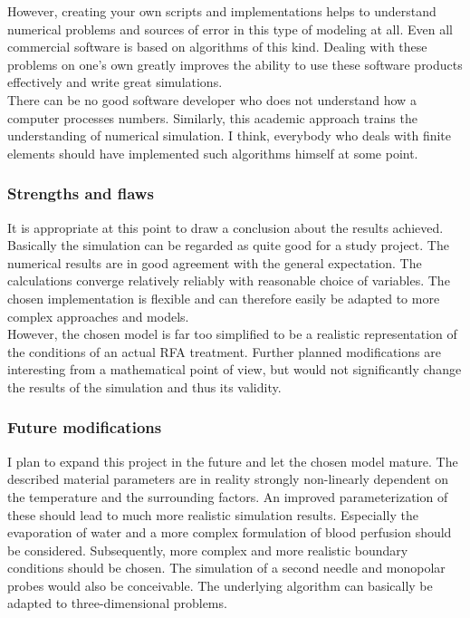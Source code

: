 \documentclass[parskip=half, titlepage=yes, 12pt, BCOR=12mm, DIV=calc]{scrartcl}
\begin{document}
However, creating your own scripts and implementations helps to understand numerical problems and sources of error in this type of modeling at all. Even all commercial software is based on algorithms of this kind. Dealing with these problems on one's own greatly improves the ability to use these software products effectively and write great simulations.\\

There can be no good software developer who does not understand how a computer processes numbers. Similarly, this academic approach trains the understanding of numerical simulation. I think, everybody who deals with finite elements should have implemented such algorithms himself at some point. \\

\subsubsection{Strengths and flaws}
It is appropriate at this point to draw a conclusion about the results achieved. \\
Basically the simulation can be regarded as quite good for a study project. 
The numerical results are in good agreement with the general expectation. The calculations converge relatively reliably with reasonable choice of variables.
The chosen implementation is flexible and can therefore easily be adapted to more complex approaches and models. \\
However, the chosen model is far too simplified to be a realistic representation of the conditions of an actual RFA treatment. Further planned modifications are interesting from a mathematical point of view, but would not significantly change the results of the simulation and thus its validity.


\subsubsection{Future modifications}
I plan to expand this project in the future and let the chosen model mature. The described material parameters are in reality strongly non-linearly dependent on the temperature and the surrounding factors. An improved parameterization of these should lead to much more realistic simulation results. Especially the evaporation of water and a more complex formulation of blood perfusion should be considered. Subsequently, more complex and more realistic boundary conditions should be chosen. 
The simulation of a second needle and monopolar probes would also be conceivable. The underlying algorithm can basically be adapted to three-dimensional problems.
\end{document}
